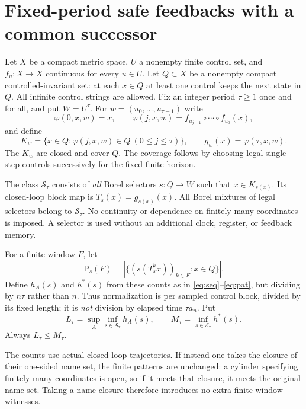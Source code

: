 \documentclass[11pt,reqno]{amsart}
\numberwithin{equation}{section}
\theoremstyle{definition}
\theoremstyle{remark}
\newcommand{\Ssafe}{\mathscr S}
\newcommand{\Patt}{\mathsf P}
\newcommand{\hpat}{h^{*}}
\begin{document}
\section{Fixed-period safe feedbacks with a common successor}

Let $X$ be a compact metric space, $U$ a nonempty finite control set, and
$f_u:X\to X$ continuous for every $u\in U$. Let $Q\subset X$ be a
nonempty compact controlled-invariant set: at each $x\in Q$ at least
one control keeps the next state in $Q$. All infinite control strings
are allowed. Fix an integer period $\tau\ge1$ once and for all, and put
$W=U^\tau$. For $w=(u_0,\ldots,u_{\tau-1})$ write
\[
 \varphi(0,x,w)=x,\qquad
 \varphi(j,x,w)=f_{u_{j-1}}\circ\cdots\circ f_{u_0}(x),
\]
and define
\begin{equation}\label{eq:safe}
 K_w=\{x\in Q:\varphi(j,x,w)\in Q\ (0\le j\le\tau)\},
 \qquad g_w(x)=\varphi(\tau,x,w).
\end{equation}
The $K_w$ are closed and cover $Q$. The coverage follows by choosing
legal single-step controls successively for the fixed finite horizon.

The class $\Ssafe_\tau$ consists of \emph{all} Borel selectors $s:Q\to W$
such that $x\in K_{s(x)}$. Its closed-loop block map is
$T_s(x)=g_{s(x)}(x)$. All Borel mixtures of legal selectors belong to
$\Ssafe_\tau$. No continuity or dependence on finitely many coordinates
is imposed. A selector is used without an additional clock, register,
or feedback memory.

For a finite window $F$, let
\[
 \Patt_s(F)=\left|\{(s(T_s^k x))_{k\in F}:x\in Q\}\right|.
\]
Define $h_A(s)$ and $\hpat(s)$ from these counts as in
\eqref{eq:seq}--\eqref{eq:pat}, but dividing by $n\tau$ rather than
$n$. Thus normalization is per sampled control block, divided by its
fixed length; it is \emph{not} division by elapsed time $\tau a_n$.
Put
\begin{equation}\label{eq:LM}
 L_\tau=\sup_A\inf_{s\in\Ssafe_\tau}h_A(s),\qquad
 M_\tau=\inf_{s\in\Ssafe_\tau}\hpat(s).
\end{equation}
Always $L_\tau\le M_\tau$.

The counts use actual closed-loop trajectories. If instead one takes
the closure of their one-sided name set, the finite patterns are
unchanged: a cylinder specifying finitely many coordinates is open, so
if it meets that closure, it meets the original name set. Taking a name
closure therefore introduces no extra finite-window witnesses.
\end{document}

